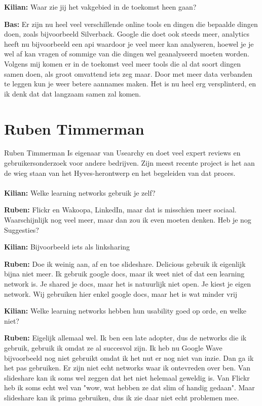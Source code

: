 \textbf{Kilian:} Waar zie jij het vakgebied in de toekomst heen gaan?

\textbf{Bas:} Er zijn nu heel veel verschillende online tools en dingen die bepaalde dingen doen, zoals bijvoorbeeld Silverback. Google die doet ook steeds meer, analytics heeft nu bijvoorbeeld een api waardoor je veel meer kan analyseren, hoewel je je wel af kan vragen of sommige van die dingen wel geanalyseerd moeten worden. Volgens mij komen er in de toekomst veel meer tools die al dat soort dingen samen doen, als groot omvattend iets zeg maar. Door met meer data verbanden te leggen kun je weer betere aannames maken. Het is nu heel erg versplinterd, en ik denk dat dat langzaam samen zal komen.

\section{Ruben Timmerman}
Ruben Timmerman Is eigenaar van Usearchy en doet veel expert reviews en gebruikersonderzoek voor andere bedrijven. Zijn meest recente project is het aan de wieg staan van het Hyves-herontwerp en het begeleiden van dat proces.

\paragraph{}
\textbf{Kilian:} Welke learning networks gebruik je zelf?

\textbf{Ruben:} Flickr en Wakoopa, LinkedIn, maar dat is misschien meer sociaal. Waarschijnlijk nog veel meer, maar dan zou ik even moeten denken. Heb je nog Suggesties?

\textbf{Kilian:} Bijvoorbeeld iets als linksharing

\textbf{Ruben:} Doe ik weinig aan, af en toe slideshare. Delicious gebruik ik eigenlijk bijna niet meer. Ik gebruik google docs, maar ik weet niet of dat een learning network is. Je shared je docs, maar het is natuurlijk niet open. Je kiest je eigen network. Wij gebruiken hier enkel google docs, maar het is wat minder vrij

\textbf{Kilian:} Welke learning networks hebben hun usability goed op orde, en welke niet?

\textbf{Ruben:} Eigelijk allemaal wel. Ik ben een late adopter, dus de networks die ik gebruik, gebruik ik omdat ze al succesvol zijn. Ik heb nu Google Wave bijvoorbeeld nog niet gebruikt omdat ik het nut er nog niet van inzie. Dan ga ik het pas gebruiken. Er zijn niet echt networks waar ik ontevreden over ben. Van slideshare kan ik soms wel zeggen dat het niet helemaal geweldig is. Van Flickr heb ik soms echt wel van "wow, wat hebben ze dat slim of handig gedaan". Maar slideshare kan ik prima gebruiken, dus ik zie daar niet echt problemen mee.

